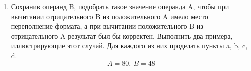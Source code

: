 \documentclass{article}
\begin{document}
\begin{enumerate}
        $$\begin{array}{ccc|cccccccccccccc}
            \SPACE & \INT                                                                                            \\
                   &              & \rcar &   &   & \rcar &   &   &   &   &  & \SIGN  &      & \USIGN                \\
            \MINUS & A_{\MM{пр.}} & 1     & 0 & 1 & 1     & 0 & 1 & 1 & 1 &  & \MINUS & -73  &        & \MINUS & 183 \\
                   & B_{\MM{пр.}} & 0     & 1 & 0 & 0     & 0 & 0 & 0 & 0 &  &        & 64   &        &        & 64  \\ \cline{2-2} \cline{5-10} \cline{12-13} \cline{15-16}
                   & C_{\MM{пр.}} & 0     & 1 & 1 & 1     & 0 & 1 & 1 & 1 &  &        & -137 &        &        & 119 \\
          \end{array}
        $$
        $$ CF=0,\ ZF=0,\ PF=1,\ AF=0,\ SF=0,\ OF=1,\ $$
        Для знаковой интерпретации результат некорректен вследствие возникающего переполнения.
        $$\begin{array}{ccc|cccccccccccccc}
            \SPACE & \INT                                                                                       \\
                   &              & \ncar &   &   &   &   &   &   &   &  & \SIGN  &     & \USIGN                \\
            \MINUS & A_{\MM{пр.}} & 0     & 1 & 0 & 0 & 1 & 0 & 0 & 1 &  & \MINUS & 73  &        & \MINUS & 73  \\
                   & B_{\MM{пр.}} & 1     & 1 & 0 & 0 & 0 & 0 & 0 & 0 &  &        & -64 &        &        & 192 \\ \cline{2-2} \cline{5-10} \cline{12-13} \cline{15-16}
                   & C_{\MM{пр.}} & 1     & 0 & 0 & 0 & 1 & 0 & 0 & 1 &  &        &     &        &        & 137 \\ \cline{2-2} \cline{5-10} \cline{12-13} \cline{15-16}
                   & C_{\MM{об.}} & 0     & 1 & 1 & 1 & 0 & 1 & 1 & 1 &  &        & 137 &        &        &     \\
          \end{array}
        $$
        $$ CF=1,\ ZF=0,\ PF=0,\ AF=0,\ SF=1,\ OF=1,\ $$
        Для знаковой интерпретации результат некорректен вследствие возникающего переполнения, для беззнаковой интерпретации результат некорректен из-за возникающего заёма из старшего разряда.
  \item Сохранив операнд B, подобрать такое значение операнда A, чтобы при вычитании отрицательного B из положительного A имело место переполнение формата, а при вычитании положительного B из отрицательного A результат был бы корректен. Выполнить два примера, иллюстрирующие этот случай. Для каждого из них проделать пункты a, b, c, d.
        $$ A = 80,\ B = 48 $$


\end{enumerate}
\end{document}
